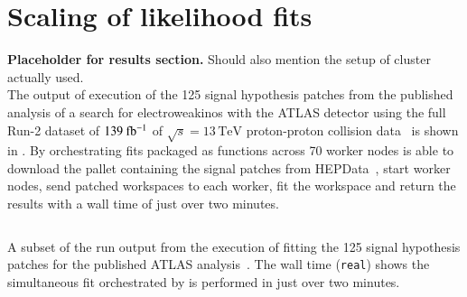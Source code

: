 \section{Scaling of likelihood fits}\label{sec:results}

\textbf{Placeholder for results section.}
Should also mention the setup of cluster actually used.\\

The output of execution of the 125 signal hypothesis patches from the published analysis of a search for electroweakinos with the ATLAS detector using the full Run-2 dataset of \(139~\ifb\) of \(\sqrt{s} = 13\,\text{TeV}\) proton-proton collision data~\cite{SUSY-2019-08} is shown in .
By orchestrating \pyhf{} fits packaged as \funcX{} functions across 70 worker nodes \funcX{} is able to download the \pyhf{} pallet containing the signal patches from HEPData~\cite{ATLAS_SUSY_1Lbb_pallet}, start \funcX{} worker nodes, send patched workspaces to each worker, fit the workspace and return the results with a wall time of just over two minutes.
\\

\begin{listing}
 \inputminted{text}{src/code/funcX_demo_output.txt}
 \caption{A subset of the run output from the execution of fitting the 125 signal hypothesis patches for the published ATLAS analysis~\cite{SUSY-2019-08}.
 The wall time (\texttt{real}) shows the simultaneous fit orchestrated by \funcX{} is performed in just over two minutes.}
 \label{lst:funcX_demo_output}
\end{listing}
